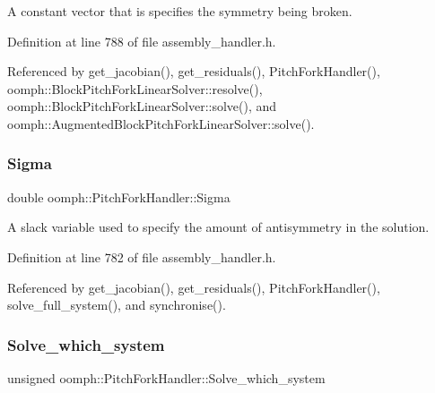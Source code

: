 A constant vector that is specifies the symmetry being broken. 



Definition at line 788 of file assembly\+\_\+handler.\+h.



Referenced by get\+\_\+jacobian(), get\+\_\+residuals(), Pitch\+Fork\+Handler(), oomph\+::\+Block\+Pitch\+Fork\+Linear\+Solver\+::resolve(), oomph\+::\+Block\+Pitch\+Fork\+Linear\+Solver\+::solve(), and oomph\+::\+Augmented\+Block\+Pitch\+Fork\+Linear\+Solver\+::solve().

\mbox{\label{classoomph_1_1PitchForkHandler_a56a173cbdf59e73728c9c1b8c5221817}} 
\subsubsection{\texorpdfstring{Sigma}{Sigma}}
{\footnotesize\ttfamily double oomph\+::\+Pitch\+Fork\+Handler\+::\+Sigma\hspace{0.3cm}{\ttfamily [private]}}



A slack variable used to specify the amount of antisymmetry in the solution. 



Definition at line 782 of file assembly\+\_\+handler.\+h.



Referenced by get\+\_\+jacobian(), get\+\_\+residuals(), Pitch\+Fork\+Handler(), solve\+\_\+full\+\_\+system(), and synchronise().

\mbox{\label{classoomph_1_1PitchForkHandler_a614de1eea213de58687ed161fc7c53ae}} 
\subsubsection{\texorpdfstring{Solve\+\_\+which\+\_\+system}{Solve\_which\_system}}
{\footnotesize\ttfamily unsigned oomph\+::\+Pitch\+Fork\+Handler\+::\+Solve\+\_\+which\+\_\+system\hspace{0.3cm}{\ttfamily [private]}}



